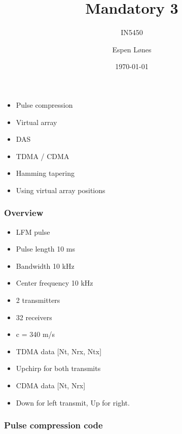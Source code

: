 \documentclass{beamer}
\begin{document}
\title{Mandatory 3}
\subtitle{IN5450}
\author{Espen Lønes}
\institute{}
\date{\today}

\begin{frame}
	\titlepage
\end{frame}

\begin{frame}
	\frametitle{}
    \begin{itemize}
    \item Pulse compression
    \item Virtual array
    \item DAS
    \item TDMA / CDMA 
    \item Hamming tapering
    \item Using virtual array positions
    \end{itemize}
\end{frame}

\begin{frame}
	\frametitle{Overview}
	\begin{itemize}
		\item LFM pulse
		\item Pulse length 10 ms
		\item Bandwidth 10 kHz
		\item Center frequency 10 kHz
		\item 2 transmitters
		\item 32 receivers
		\item c = 340 m/s 
		\item TDMA data [Nt, Nrx, Ntx]
		\item Upchirp for both transmits
		\item CDMA data [Nt, Nrx]
		\item Down for left transmit, Up for right.
	\end{itemize}
\end{frame}

\begin{frame}
	\frametitle{Pulse compression code}
	\begin{figure}
	\end{figure}

\end{frame}
\end{document}
